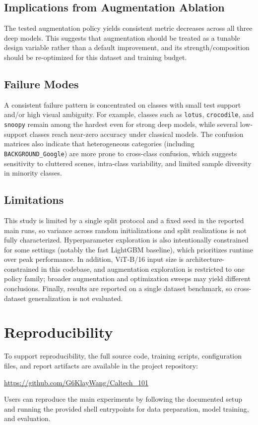 \documentclass[11pt]{article}
\begin{document}
\subsection{Implications from Augmentation Ablation}
The tested augmentation policy yields consistent metric decreases across all three deep models. This suggests that augmentation should be treated as a tunable design variable rather than a default improvement, and its strength/composition should be re-optimized for this dataset and training budget.

\subsection{Failure Modes}
A consistent failure pattern is concentrated on classes with small test support and/or high visual ambiguity. For example, classes such as \texttt{lotus}, \texttt{crocodile}, and \texttt{snoopy} remain among the hardest even for strong deep models, while several low-support classes reach near-zero accuracy under classical models. The confusion matrices also indicate that heterogeneous categories (including \texttt{BACKGROUND\_Google}) are more prone to cross-class confusion, which suggests sensitivity to cluttered scenes, intra-class variability, and limited sample diversity in minority classes.

\subsection{Limitations}
This study is limited by a single split protocol and a fixed seed in the reported main runs, so variance across random initializations and split realizations is not fully characterized. Hyperparameter exploration is also intentionally constrained for some settings (notably the fast LightGBM baseline), which prioritizes runtime over peak performance. In addition, ViT-B/16 input size is architecture-constrained in this codebase, and augmentation exploration is restricted to one policy family; broader augmentation and optimization sweeps may yield different conclusions. Finally, results are reported on a single dataset benchmark, so cross-dataset generalization is not evaluated.

\section{Reproducibility}
To support reproducibility, the full source code, training scripts, configuration files, and report artifacts are available in the project repository:
\begin{center}
\url{https://github.com/G6KlayWang/Caltech_101}
\end{center}
Users can reproduce the main experiments by following the documented setup and running the provided shell entrypoints for data preparation, model training, and evaluation.
\end{document}
